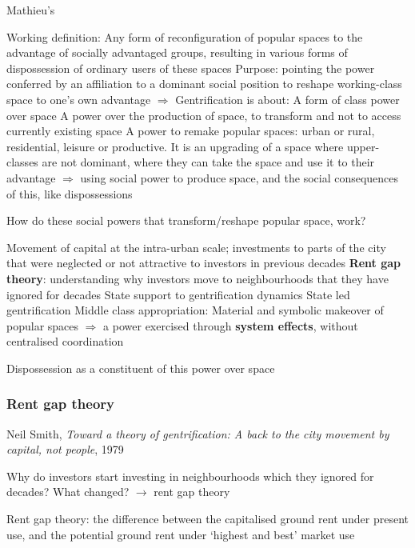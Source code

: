\documentclass{article}
\begin{document}
Mathieu's 
\begin{outline}
	\1 Working definition: Any form of reconfiguration of popular spaces to the advantage of socially advantaged groups, resulting in various forms of dispossession of ordinary users of these spaces
	\1 Purpose: pointing the power conferred by an affiliation to a dominant social position to reshape working-class space to one's own advantage
	\1 $\Rightarrow$ Gentrification is about:
		\2 A form of class power over space
		\2 A power over the production of space, to transform and not to access currently existing space
		\2 A power to remake popular spaces: urban or rural, residential, leisure or productive. It is an upgrading of a space where upper-classes are not dominant, where they can take the space and use it to their advantage
		\2 $\Rightarrow$ using social power to produce space, and the social consequences of this, like dispossessions
\end{outline}

How do these social powers that transform/reshape popular space, work?

\begin{outline}
	\1 Movement of capital at the intra-urban scale; investments to parts of the city that were neglected or not attractive to investors in previous decades
		\2 \textbf{Rent gap theory}: understanding why investors move to neighbourhoods that they have ignored for decades
	\1 State support to gentrification dynamics
		\2 State led gentrification
	\1 Middle class appropriation: 
		\2 Material and symbolic makeover of popular spaces
	\1 $\Rightarrow$ a power exercised through \textbf{system effects}, without centralised coordination
\end{outline}

Dispossession as a constituent of this power over space

\subsubsection{Rent gap theory}

Neil Smith, \textit{Toward a theory of gentrification: A back to the city movement by capital, not people}, 1979

Why do investors start investing in neighbourhoods which they ignored for decades? What changed? $\rightarrow$ rent gap theory

Rent gap theory: the difference between the capitalised ground rent under present use, and the potential ground rent under `highest and best' market use
\end{document}
